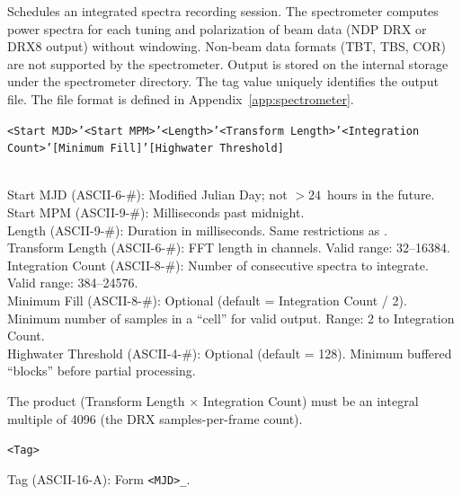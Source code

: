 \begin{description}[style=nextline]
    \item[Description:]
        Schedules an integrated spectra recording session.  The spectrometer
        computes power spectra for each tuning and polarization of beam data
        (NDP DRX or DRX8 output) without windowing.  Non-beam data formats
        (TBT, TBS, COR) are not supported by the spectrometer.  Output is stored on the internal
        storage under the spectrometer directory.  The tag value uniquely
        identifies the output file.  The file format is defined in
        Appendix~\ref{app:spectrometer}.

    \item[Argument Format:]
        \texttt{<Start MJD>'<Start MPM>'<Length>'<Transform Length>'<Integration Count>'[Minimum Fill]'[Highwater Threshold]}

    \item[Arguments:]~\\
        Start MJD (ASCII-6-\#): Modified Julian Day; not $>24$~hours in the future. \\
        Start MPM (ASCII-9-\#): Milliseconds past midnight. \\
        Length (ASCII-9-\#): Duration in milliseconds.  Same restrictions as
            . \\
        Transform Length (ASCII-6-\#): FFT length in channels.
            Valid range: 32--16384. \\
        Integration Count (ASCII-8-\#): Number of consecutive spectra to
            integrate.  Valid range: 384--24576. \\
        Minimum Fill (ASCII-8-\#): Optional (default = Integration Count / 2).
            Minimum number of samples in a ``cell'' for valid output.
            Range: 2 to Integration Count. \\
        Highwater Threshold (ASCII-4-\#): Optional (default = 128).
            Minimum buffered ``blocks'' before partial processing.

    \item[Validation:]
        The product (Transform Length $\times$ Integration Count) must be an
        integral multiple of 4096 (the DRX samples-per-frame count).

    \item[Response Format:] \texttt{<Tag>}
    \item[Response Element:]
        Tag (ASCII-16-A): Form \texttt{<MJD>\_<Reference Number>}.

\end{description}

